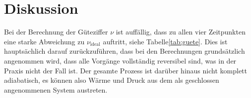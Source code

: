\section{Diskussion}
\label{sec:Diskussion}

Bei der Berechnung der Güteziffer $\nu$ ist auffällig, dass zu allen vier Zeitpunkten eine starke Abweichung zu $\nu_\text{ideal}$ auftritt,
siehe Tabelle\:\ref{tab:guete}. Dies ist hauptsächlich darauf zurückzuführen, dass bei den Berechnungen grundsätzlich angenommen wird, dass alle
Vorgänge vollständig reversibel sind, was in der Praxis nicht der Fall ist. Der gesamte Prozess ist darüber hinaus nicht komplett 
adiabatisch, es können also Wärme und Druck aus dem als geschlossen angenommenen System austreten.